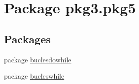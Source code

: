 \hypertarget{namespacepkg3_1_1pkg5}{}\section{Package pkg3.\+pkg5}
\label{namespacepkg3_1_1pkg5}
\subsection*{Packages}
\begin{DoxyCompactItemize}
\item 
package \mbox{\hyperlink{namespacepkg3_1_1pkg5_1_1buclesdowhile}{buclesdowhile}}
\item 
package \mbox{\hyperlink{namespacepkg3_1_1pkg5_1_1bucleswhile}{bucleswhile}}
\end{DoxyCompactItemize}
